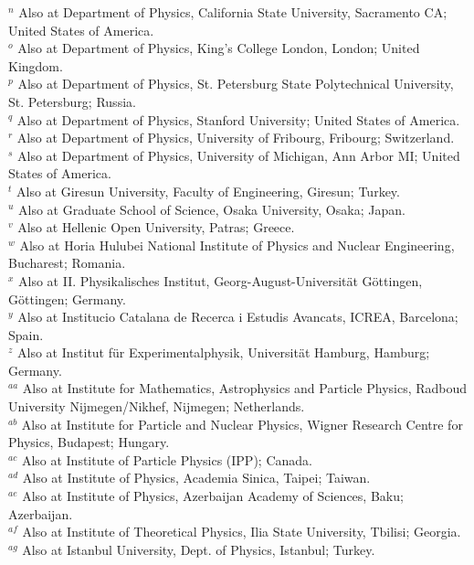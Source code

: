 \begin{flushleft}
$^{n}$ Also at Department of Physics, California State University, Sacramento CA; United States of America.\\
$^{o}$ Also at Department of Physics, King's College London, London; United Kingdom.\\
$^{p}$ Also at Department of Physics, St. Petersburg State Polytechnical University, St. Petersburg; Russia.\\
$^{q}$ Also at Department of Physics, Stanford University; United States of America.\\
$^{r}$ Also at Department of Physics, University of Fribourg, Fribourg; Switzerland.\\
$^{s}$ Also at Department of Physics, University of Michigan, Ann Arbor MI; United States of America.\\
$^{t}$ Also at Giresun University, Faculty of Engineering, Giresun; Turkey.\\
$^{u}$ Also at Graduate School of Science, Osaka University, Osaka; Japan.\\
$^{v}$ Also at Hellenic Open University, Patras; Greece.\\
$^{w}$ Also at Horia Hulubei National Institute of Physics and Nuclear Engineering, Bucharest; Romania.\\
$^{x}$ Also at II. Physikalisches Institut, Georg-August-Universit\"{a}t G\"ottingen, G\"ottingen; Germany.\\
$^{y}$ Also at Institucio Catalana de Recerca i Estudis Avancats, ICREA, Barcelona; Spain.\\
$^{z}$ Also at Institut f\"{u}r Experimentalphysik, Universit\"{a}t Hamburg, Hamburg; Germany.\\
$^{aa}$ Also at Institute for Mathematics, Astrophysics and Particle Physics, Radboud University Nijmegen/Nikhef, Nijmegen; Netherlands.\\
$^{ab}$ Also at Institute for Particle and Nuclear Physics, Wigner Research Centre for Physics, Budapest; Hungary.\\
$^{ac}$ Also at Institute of Particle Physics (IPP); Canada.\\
$^{ad}$ Also at Institute of Physics, Academia Sinica, Taipei; Taiwan.\\
$^{ae}$ Also at Institute of Physics, Azerbaijan Academy of Sciences, Baku; Azerbaijan.\\
$^{af}$ Also at Institute of Theoretical Physics, Ilia State University, Tbilisi; Georgia.\\
$^{ag}$ Also at Istanbul University, Dept. of Physics, Istanbul; Turkey.\\

\end{flushleft}

